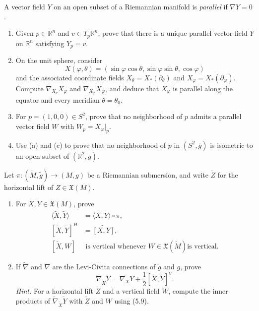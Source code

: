 \begin{exercise}
\label{prob:parallel-vector-fields}

A vector field $Y$ on an open subset of a Riemannian manifold is
\emph{parallel} if $\nabla Y=0$.
\begin{enumerate}
\item[(a)] Given $p\in\mathbb R^n$ and $v\in T_p\mathbb R^n$, prove that
there is a unique parallel vector field $Y$ on $\mathbb R^n$ satisfying
$Y_p=v$.
\item[(b)] On the unit sphere, consider
\[
X(\varphi,\theta)
=(\sin\varphi\cos\theta,\sin\varphi\sin\theta,\cos\varphi)
\]
and the associated coordinate fields $X_\theta=X_*(\partial_\theta)$ and
$X_\varphi=X_*(\partial_\varphi)$. Compute
$\nabla_{X_\theta}X_\varphi$ and $\nabla_{X_\varphi}X_\varphi$, and deduce that
$X_\varphi$ is parallel along the equator and every meridian
$\theta=\theta_0$.
\item[(c)] For $p=(1,0,0)\in S^2$, prove that no neighborhood of $p$ admits
a parallel vector field $W$ with $W_p=X_\varphi|_p$.
\item[(d)] Use (a) and (c) to prove that no neighborhood of $p$ in
$(S^2,\overline g)$ is isometric to an open subset of
$(\mathbb R^2,\overline g)$.
\end{enumerate}
\end{exercise}

\begin{exercise}
\label{prob:riemannian-submersion-connection}

Let $\pi:(\widetilde M,\widetilde g)\to(M,g)$ be a Riemannian submersion, and
write $\widetilde Z$ for the horizontal lift of $Z\in\mathfrak X(M)$.
\begin{enumerate}
\item[(a)] For $X,Y\in\mathfrak X(M)$, prove
\begin{align*}
\langle\widetilde X,\widetilde Y\rangle&=\langle X,Y\rangle\circ\pi,\\
[\widetilde X,\widetilde Y]^H&=\widetilde{[X,Y]},\\
[\widetilde X,W]&\text{ is vertical whenever $W\in\mathfrak X(\widetilde M)$
is vertical.}
\end{align*}
\item[(b)] If $\widetilde\nabla$ and $\nabla$ are the Levi-Civita connections
of $\widetilde g$ and $g$, prove
\begin{equation}
\widetilde\nabla_{\widetilde X}\widetilde Y
=\widetilde{\nabla_XY}+\frac12[\widetilde X,\widetilde Y]^V.
\tag{5.27}
\end{equation}
\emph{Hint.} For a horizontal lift $\widetilde Z$ and a vertical field $W$,
compute the inner products of
$\widetilde\nabla_{\widetilde X}\widetilde Y$ with $\widetilde Z$ and $W$
using (5.9).
\end{enumerate}
\end{exercise}

